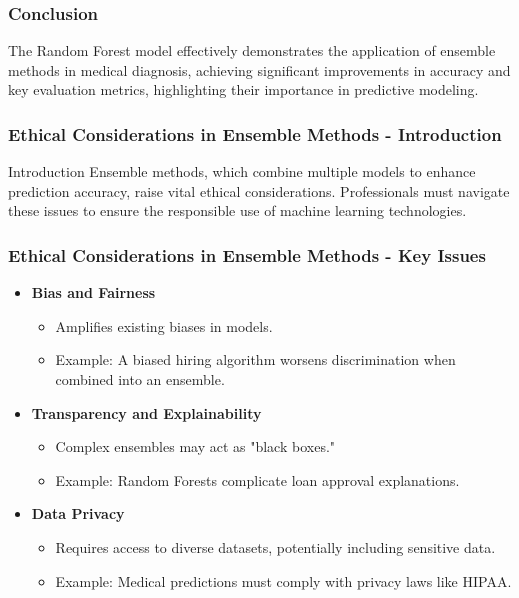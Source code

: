 \documentclass[aspectratio=169]{beamer}
\begin{document}
\begin{frame}[fragile]
    \frametitle{Conclusion}
    The Random Forest model effectively demonstrates the application of ensemble methods in medical diagnosis, achieving significant improvements in accuracy and key evaluation metrics, highlighting their importance in predictive modeling.
\end{frame}

\begin{frame}[fragile]
    \frametitle{Ethical Considerations in Ensemble Methods - Introduction}
    \begin{block}{Introduction}
        Ensemble methods, which combine multiple models to enhance prediction accuracy, raise vital ethical considerations. Professionals must navigate these issues to ensure the responsible use of machine learning technologies.
    \end{block}
\end{frame}

\begin{frame}[fragile]
    \frametitle{Ethical Considerations in Ensemble Methods - Key Issues}
    \begin{itemize}
        \item \textbf{Bias and Fairness}
        \begin{itemize}
            \item Amplifies existing biases in models.
            \item Example: A biased hiring algorithm worsens discrimination when combined into an ensemble.
        \end{itemize}
        
        \item \textbf{Transparency and Explainability}
        \begin{itemize}
            \item Complex ensembles may act as "black boxes."
            \item Example: Random Forests complicate loan approval explanations.
        \end{itemize}
        
        \item \textbf{Data Privacy}
        \begin{itemize}
            \item Requires access to diverse datasets, potentially including sensitive data.
            \item Example: Medical predictions must comply with privacy laws like HIPAA.
        \end{itemize}
    \end{itemize}
\end{frame}
\end{document}
